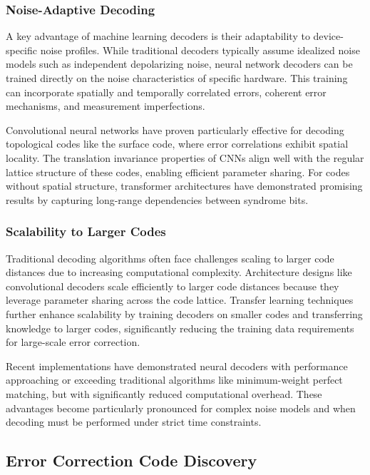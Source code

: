 \subsubsection{Noise-Adaptive Decoding}

A key advantage of machine learning decoders is their adaptability to device-specific noise profiles. While traditional decoders typically assume idealized noise models such as independent depolarizing noise, neural network decoders can be trained directly on the noise characteristics of specific hardware. This training can incorporate spatially and temporally correlated errors, coherent error mechanisms, and measurement imperfections.

Convolutional neural networks have proven particularly effective for decoding topological codes like the surface code, where error correlations exhibit spatial locality. The translation invariance properties of CNNs align well with the regular lattice structure of these codes, enabling efficient parameter sharing. For codes without spatial structure, transformer architectures have demonstrated promising results by capturing long-range dependencies between syndrome bits.

\subsubsection{Scalability to Larger Codes}

Traditional decoding algorithms often face challenges scaling to larger code distances due to increasing computational complexity. Architecture designs like convolutional decoders scale efficiently to larger code distances because they leverage parameter sharing across the code lattice. Transfer learning techniques further enhance scalability by training decoders on smaller codes and transferring knowledge to larger codes, significantly reducing the training data requirements for large-scale error correction.

Recent implementations have demonstrated neural decoders with performance approaching or exceeding traditional algorithms like minimum-weight perfect matching, but with significantly reduced computational overhead. These advantages become particularly pronounced for complex noise models and when decoding must be performed under strict time constraints.

\subsection{Error Correction Code Discovery}

